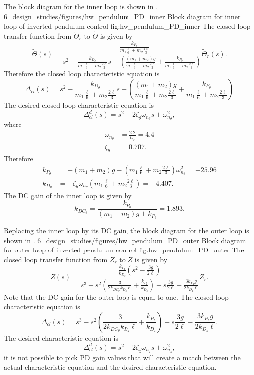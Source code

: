 The block diagram for the inner loop is shown in .
	{6_design_studies/figures/hw_pendulum_PD_inner}
	{Block diagram for inner loop of inverted pendulum control}
	{fig:hw_pendulum_PD_inner}
The closed loop transfer function from $\tilde{\Theta}_r$ to $\tilde{\Theta}$ is given by
\[
\tilde{\Theta}(s) = \frac{-\frac{k_{P_\theta}}{m_1 \frac{\ell}{6} +m_2\frac{2\ell}{3}}}{s^2 - \frac{k_{D_\theta}}{m_1 \frac{\ell}{6} +m_2\frac{2\ell}{3}}s-\left(\frac{(m_1+m_2)g}{m_1 \frac{\ell}{6} +m_2\frac{2\ell}{3}}+\frac{k_{P_\theta}}{m_1 \frac{\ell}{6} +m_2\frac{2\ell}{3}}\right)} \tilde{\Theta}_r(s).
\]
Therefore the closed loop characteristic equation is
\[
\Delta_{cl}(s) =s^2 - \frac{k_{D_\theta}}{m_1 \frac{\ell}{6} +m_2\frac{2\ell}{3}}s-\left(\frac{(m_1+m_2)g}{m_1 \frac{\ell}{6} +m_2\frac{2\ell}{3}}+\frac{k_{P_\theta}}{m_1 \frac{\ell}{6} +m_2\frac{2\ell}{3}}\right)
\]
The desired closed loop characteristic equation is
\[
\Delta_{cl}^d(s) = s^2 + 2\zeta_{\theta}\omega_{n_\theta} s + \omega_{n_\theta}^2,
\]
where
\begin{align*}
\omega_{n_\theta} &= \frac{2.2}{t_{r_\theta}} = 4.4 \\
\zeta_{\theta} &= 0.707.
\end{align*}
Therefore
\begin{align*}
k_{P_\theta} &= -(m_1+m_2)g - (m_1 \frac{\ell}{6} +m_2\frac{2\ell}{3})\omega_{n_\theta}^2 = -25.96 \\
k_{D_\theta} &= -\zeta_{\theta}\omega_{n_\theta} (m_1 \frac{\ell}{6} +m_2\frac{2\ell}{3}) = -4.407.
\end{align*}
The DC gain of the inner loop is given by
\[
k_{DC_{\theta}} = \frac{k_{P_\theta}}{(m_1+m_2)g+k_{P_\theta}} = 1.893.
\]

Replacing the inner loop by its DC gain, the block diagram for the outer loop is shown in .
	{6_design_studies/figures/hw_pendulum_PD_outer}
	{Block diagram for outer loop of inverted pendulum control}
	{fig:hw_pendulum_PD_outer}
The closed loop transfer function from $Z_r$ to $Z$ is given by
\[
Z(s) = \frac{\frac{k_{P_z}}{k_{D_z}}(s^2-\frac{3g}{2\ell})}{s^3-s^2 (\frac{3}{2 k_{DC_\theta} k_{D_z} \ell} + \frac{ k_{P_z}}{k_{D_z}}) - s \frac{3 g}{2 \ell} - \frac{3 k_{P_z} g}{2 k_{D_z} \ell}} Z_r.
\]
Note that the DC gain for the outer loop is equal to one.
The closed loop characteristic equation is 
\[
\Delta_{cl}(s) = s^3-s^2 (\frac{3}{2 k_{DC_\theta} k_{D_z} \ell} + \frac{ k_{P_z}}{k_{D_z}}) - s \frac{3 g}{2 \ell} - \frac{3 k_{P_z} g}{2 k_{D_z} \ell}.
\]
The desired characteristic equation is 
\[
\Delta_{cl}^d(s) = s^2 + 2\zeta_z\omega_{n_z}s + \omega_{n_z}^2,
\]
it is not possible to pick PD gain values that will create a match between the actual characteristic equation and the desired characteristic equation.  


